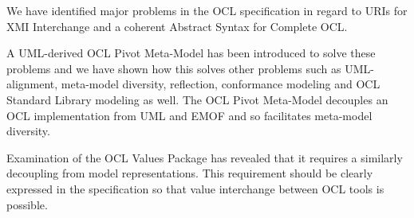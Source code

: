 \documentclass{eceasst}
\begin{document}
We have identified major problems in the OCL specification in regard to URIs for XMI Interchange and a coherent Abstract Syntax for Complete OCL.

A UML-derived OCL Pivot Meta-Model has been introduced to solve these problems and we have shown how this solves other problems such as UML-alignment, meta-model diversity, reflection, conformance modeling and OCL Standard Library modeling as well. The OCL Pivot Meta-Model decouples an OCL implementation from UML and EMOF and so facilitates meta-model diversity.

Examination of the OCL Values Package has revealed that it requires a similarly decoupling from model representations. This requirement should be clearly expressed in the specification so that value interchange between OCL tools is possible. 

\nocite{*}


\end{document}
